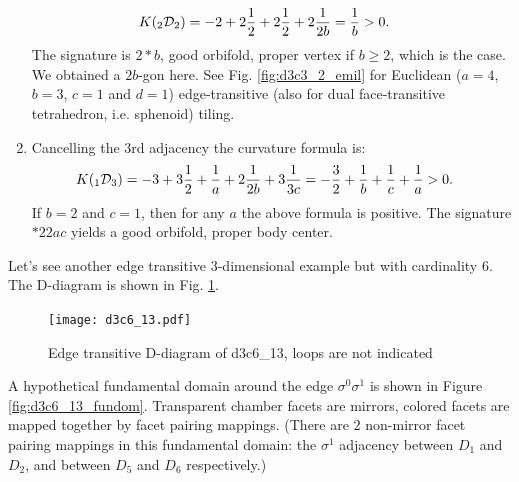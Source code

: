 \documentclass[12pt,a4paper]{article}
\numberwithin{equation}{section}
\newcommand{\leftsub}[2]{{\vphantom{#2}}_{#1}{#2}}
\theoremstyle{plain}%
\theoremstyle{definition}
\theoremstyle{remark}
\begin{document}
\begin{enumerate}
    \begin{align*}
      K(\leftsub{2}{\mathcal{D}}_2)&= -2 + 2\frac{1}{2} + 2\frac{1}{2} +
      2\frac{1}{2b} = \frac{1}{b} > 0.
    \end{align*}
    The signature is $2*b$, good orbifold, proper vertex if $b\geq2$, which is
    the case. We obtained a $2b$-gon here. See Fig. \ref{fig:d3c3_2_emil} for
    Euclidean ($a=4$, $b=3$, $c=1$ and $d=1$) edge-transitive (also for dual
    face-transitive tetrahedron, i.e. sphenoid) tiling.
  \item Cancelling the $3$rd adjacency the curvature formula is:
    \begin{align*}
      K(\leftsub{1}{\mathcal{D}}_3)&= -3 + 3\frac{1}{2} + \frac{1}{a} +
      2\frac{1}{2b} + 3\frac{1}{3c} =
       -\frac{3}{2} + \frac{1}{b} + \frac{1}{c} + \frac{1}{a} > 0.
    \end{align*}
    If $b=2$ and $c=1$, then for any $a$ the above formula is positive.
    The signature $*22ac$ yields a good orbifold, proper body center.
\end{enumerate}







Let's see another edge transitive $3$-dimensional example but with cardinality $6$. The
D-diagram is shown in Fig.
\ref{fig:d3c6_13}.

\begin{figure}
  \caption{\label{fig:d3c6_13} Edge transitive D-diagram of d3c6\_13, loops are not indicated}
  \center
  \texttt{[image: d3c6\_13.pdf]}
\end{figure}

A hypothetical fundamental domain around the edge $\sigma^0\sigma^1$ is shown in
Figure \ref{fig:d3c6_13_fundom}.
Transparent chamber facets are mirrors, colored facets are mapped together by
facet pairing mappings. (There are $2$ non-mirror facet pairing mappings in this
fundamental domain: the $\sigma^1$ adjacency between $D_1$ and $D_2$, and
between $D_5$ and $D_6$ respectively.)
\end{document}
